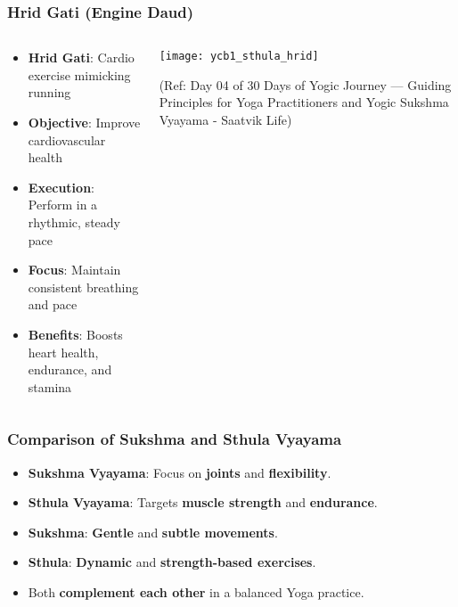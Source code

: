 \begin{frame}[fragile]\frametitle{Hrid Gati (Engine Daud)}
\begin{columns}
    \begin{column}[T]{0.5\linewidth}
      \begin{itemize}
		\item \textbf{Hrid Gati}: Cardio exercise mimicking running
		\item \textbf{Objective}: Improve cardiovascular health
		\item \textbf{Execution}: Perform in a rhythmic, steady pace
		\item \textbf{Focus}: Maintain consistent breathing and pace
		\item \textbf{Benefits}: Boosts heart health, endurance, and stamina
	  \end{itemize}
    \end{column}
    \begin{column}[T]{0.5\linewidth}
		\begin{center}
		\texttt{[image: ycb1\_sthula\_hrid]}
		
		{\tiny (Ref: Day 04 of 30 Days of Yogic Journey — Guiding Principles for Yoga Practitioners and Yogic Sukshma Vyayama - Saatvik Life)}	
		\end{center}	
    \end{column}
\end{columns}
\end{frame}

\begin{frame}[fragile]\frametitle{Comparison of Sukshma and Sthula Vyayama}

      \begin{itemize}
        \item \textbf{Sukshma Vyayama}: Focus on \textbf{joints} and \textbf{flexibility}.
        \item \textbf{Sthula Vyayama}: Targets \textbf{muscle strength} and \textbf{endurance}.
        \item \textbf{Sukshma}: \textbf{Gentle} and \textbf{subtle movements}.
        \item \textbf{Sthula}: \textbf{Dynamic} and \textbf{strength-based exercises}.
        \item Both \textbf{complement each other} in a balanced Yoga practice.
      \end{itemize}

\end{frame}


